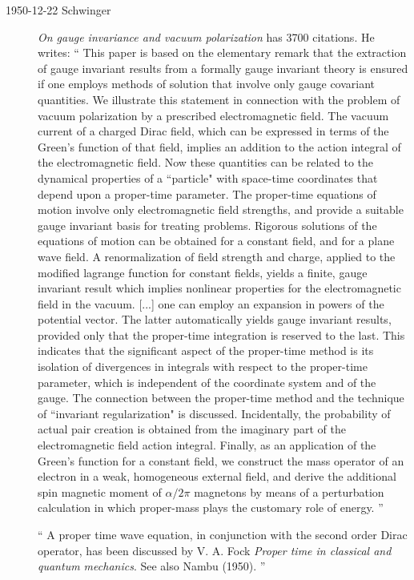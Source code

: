\begin{description}

\item[1950-12-22 Schwinger]
{\em On gauge invariance and vacuum polarization}
has 3700 citations.
He writes: ``
This paper is based on the elementary remark that the extraction of gauge
invariant results from a formally gauge invariant theory is ensured if
one employs methods of solution that involve only gauge covariant
quantities. We illustrate this statement in connection with the problem
of vacuum polarization by a prescribed electromagnetic field. The vacuum
current of a charged Dirac field, which can be expressed in terms of the
Green's function of that field, implies an addition to the action
integral of the electromagnetic field. Now these quantities can be
related to the dynamical properties of a ``particle" with space-time
coordinates that depend upon a proper-time parameter. The proper-time
equations of motion involve only electromagnetic field strengths, and
provide a suitable gauge invariant basis for treating problems. Rigorous
solutions of the equations of motion can be obtained for a constant
field, and for a plane wave field. A renormalization of field strength
and charge, applied to the modified lagrange function for constant
fields, yields a finite, gauge invariant result which implies nonlinear
properties for the electromagnetic field in the vacuum.
[...]
one can employ an expansion in powers of the potential vector. The latter
automatically yields gauge invariant results, provided only that the
proper-time integration is reserved to the last. This indicates that the
significant aspect of the proper-time method is its isolation of
divergences in integrals with respect to the proper-time parameter, which
is independent of the coordinate system and of the gauge. The connection
between the proper-time method and the technique of ``invariant
regularization" is discussed. Incidentally, the probability of actual
pair creation is obtained from the imaginary part of the electromagnetic
field action integral. Finally, as an application of the Green's function
for a constant field, we construct the mass operator of an electron in a
weak, homogeneous external field, and derive the additional spin magnetic
moment of $\alpha/2\pi$ magnetons by means of a perturbation calculation
in which proper-mass plays the customary role of energy.
''

``
A proper time wave equation, in conjunction with the second order
Dirac operator, has been discussed by
V. A. Fock
{\em Proper time in classical and quantum mechanics}.
See also Nambu (1950).
''


\end{description}
